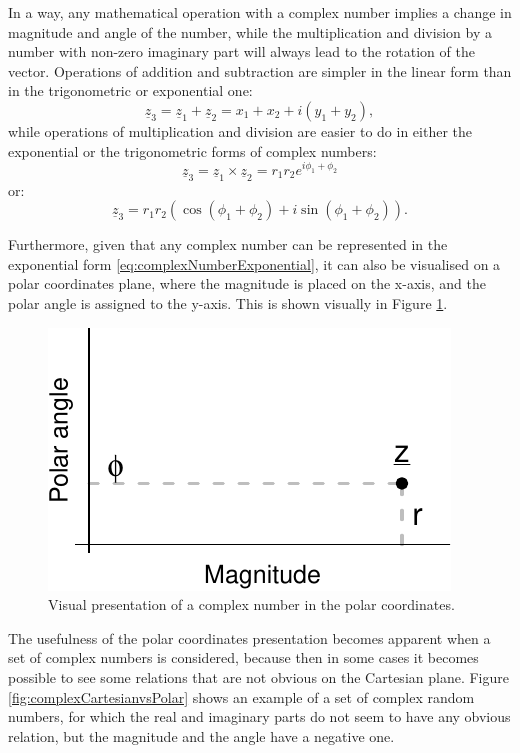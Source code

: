 \documentclass[
]{book}
\begin{document}
In a way, any mathematical operation with a complex number implies a change in magnitude and angle of the number, while the multiplication and division by a number with non-zero imaginary part will always lead to the rotation of the vector. Operations of addition and subtraction are simpler in the linear form than in the trigonometric or exponential one:
\begin{equation*}
    \underline{z}_3 = \underline{z}_1 + \underline{z}_2 = x_1 + x_2 + i (y_1 + y_2) ,
\end{equation*}
while operations of multiplication and division are easier to do in either the exponential or the trigonometric forms of complex numbers:
\begin{equation*}
    \underline{z}_3 = \underline{z}_1 \times \underline{z}_2 = r_1 r_2 e^{i \phi_1 + \phi_2} 
\end{equation*}
or:
\begin{equation*}
    \underline{z}_3 = r_1 r_2 \left(\cos (\phi_1 + \phi_2) + i \sin (\phi_1 + \phi_2) \right) .
\end{equation*}

Furthermore, given that any complex number can be represented in the exponential form \eqref{eq:complexNumberExponential}, it can also be visualised on a polar coordinates plane, where the magnitude is placed on the x-axis, and the polar angle is assigned to the y-axis. This is shown visually in Figure \ref{fig:complexPlanePolar}.

\begin{figure}
\centering
\includegraphics{Svetunkov---Svetunkov---Complex-Valued-Econometrics_files/figure-latex/complexPlanePolar-1.pdf}
\caption{\label{fig:complexPlanePolar}Visual presentation of a complex number in the polar coordinates.}
\end{figure}

The usefulness of the polar coordinates presentation becomes apparent when a set of complex numbers is considered, because then in some cases it becomes possible to see some relations that are not obvious on the Cartesian plane. Figure \ref{fig:complexCartesianvsPolar} shows an example of a set of complex random numbers, for which the real and imaginary parts do not seem to have any obvious relation, but the magnitude and the angle have a negative one.
\end{document}
